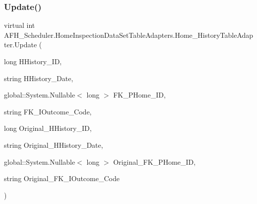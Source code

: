 \subsubsection{Update()\hspace{0.1cm}{\footnotesize\ttfamily [5/6]}}
{\footnotesize\ttfamily virtual int A\+F\+H\+\_\+\+Scheduler.\+Home\+Inspection\+Data\+Set\+Table\+Adapters.\+Home\+\_\+\+History\+Table\+Adapter.\+Update (\begin{DoxyParamCaption}\item[{long}]{H\+History\+\_\+\+ID,  }\item[{string}]{H\+History\+\_\+\+Date,  }\item[{global\+::\+System.\+Nullable$<$ long $>$}]{F\+K\+\_\+\+P\+Home\+\_\+\+ID,  }\item[{string}]{F\+K\+\_\+\+I\+Outcome\+\_\+\+Code,  }\item[{long}]{Original\+\_\+\+H\+History\+\_\+\+ID,  }\item[{string}]{Original\+\_\+\+H\+History\+\_\+\+Date,  }\item[{global\+::\+System.\+Nullable$<$ long $>$}]{Original\+\_\+\+F\+K\+\_\+\+P\+Home\+\_\+\+ID,  }\item[{string}]{Original\+\_\+\+F\+K\+\_\+\+I\+Outcome\+\_\+\+Code }\end{DoxyParamCaption})\hspace{0.3cm}{\ttfamily [virtual]}}

\mbox{\label{class_a_f_h___scheduler_1_1_home_inspection_data_set_table_adapters_1_1_home___history_table_adapter_a89be3cae6fc1e831349998e36e455e00}} 
